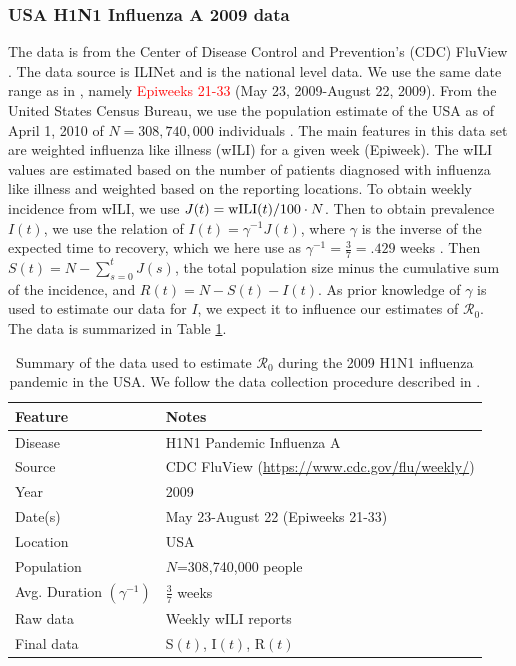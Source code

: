 \documentclass[12pt]{article}
\newcommand{\com}[1]{\textcolor{red}{ #1}}
\newcommand{\rr}{\ensuremath{\mathcal{R}_0}}
\begin{document}
      \subsubsection{USA H1N1 Influenza A 2009 data}
      The data is from the Center of Disease Control and Prevention's (CDC) FluView \citep{cdc-fluview}.  The data source is ILINet and is the national level data.  We use the same date range as in \cite{towers2009}, namely \com{Epiweeks 21-33} (May 23, 2009-August 22, 2009).  From the United States Census Bureau, we use the population estimate of the USA as of April 1, 2010 of $N=308,740,000$ individuals \citep{census-2010}.  The main features in this data set are weighted influenza like illness (wILI) for a given week (Epiweek).  The wILI values are estimated based on the number of patients diagnosed with influenza like illness and weighted based on the reporting locations.  To obtain weekly incidence from wILI, we use $J(t) = \textnormal{wILI}(t) / 100 \cdot N$.  Then to obtain prevalence $I(t)$, we use the relation of $I(t) = \gamma^{-1}J(t)$, where $\gamma$ is the inverse of the expected time to recovery, which we here use as $\gamma^{-1} = \frac{3}{7}=.429$ weeks \citep{vespignani2007}.  Then $S(t) = N - \sum_{s=0}^{t}J(s)$, the total population size minus the cumulative sum of the incidence, and $R(t) = N - S(t) - I(t)$.  As prior knowledge of $\gamma$ is used to estimate our data for $I$, we expect it to influence our estimates of $\rr$.  The data is summarized in Table \ref{tab:h1n1-data}.


\begin{table}[H]
\centering
\begin{tabular}{@{}ll@{}}
\toprule
Feature       & Notes                                                                   \\ \midrule
Disease       & H1N1 Pandemic Influenza A                                                 \\ 
Source        & CDC FluView (\url{https://www.cdc.gov/flu/weekly/})      \\
Year          & 2009                                                                    \\
Date(s)          & May 23-August 22 (Epiweeks 21-33)                                       \\
Location      & USA                                                                     \\
Population    & $N$=308,740,000 people                                                  \\
  Avg. Duration $\left ( \gamma^{-1}\right )$ & $\frac{3}{7}$ weeks\\
  Raw data & Weekly wILI reports\\
  Final data & S$(t)$, I$(t)$, R$(t)$ \\\bottomrule
\end{tabular}
\caption{Summary of the data used to estimate $\rr$ during the 2009 H1N1 influenza pandemic in the USA.  We follow the data collection procedure described in \cite{towers2009}.}
\label{tab:h1n1-data}
\end{table}
\end{document}
